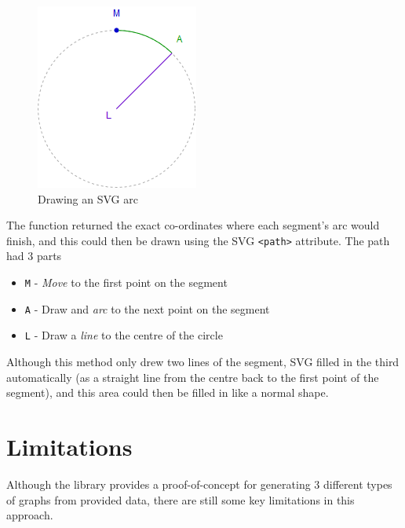 \documentclass[ %
                    author={Aleena Baig},
                supervisor={Dr Simon Lock},
                    degree={BSc},
                     title={On Making Web Accessible Graphs},
                  subtitle={},
                      year={2019} ]{dissertation}
\begin{document}
\begin{figure}
\includegraphics[width=0.8\linewidth]{images/DrawingArc.png} 
\caption{Drawing an SVG arc}
\end{figure}

The function returned the exact co-ordinates where each segment's arc would finish, and this could then be drawn using the SVG \texttt{<path>} attribute. The path had 3 parts

\begin{itemize}
    \item \texttt{M} - \textit{Move} to the first point on the segment
    \item \texttt{A} - Draw and \textit{arc} to the next point on the segment
    \item \texttt{L} - Draw a \textit{line} to the centre of the circle
\end{itemize}

Although this method only drew two lines of the segment, SVG filled in the third automatically (as a straight line from the centre back to the first point of the segment), and this area could then be filled in like a normal shape.

\section{Limitations}

Although the library provides a proof-of-concept for generating 3 different types of graphs from provided data, there are still some key limitations in this approach.
\end{document}
